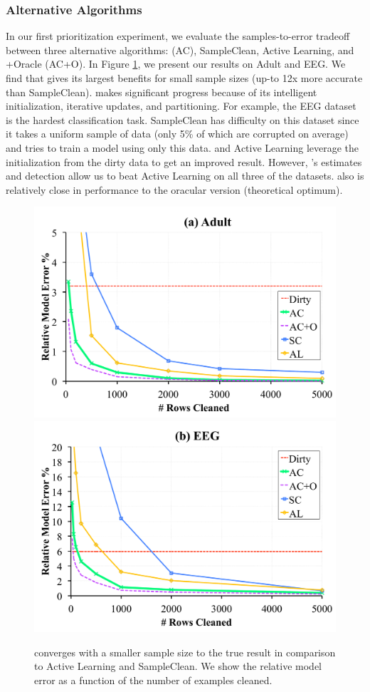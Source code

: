 \subsubsection{Alternative Algorithms}
In our first prioritization experiment, we evaluate the samples-to-error tradeoff between three alternative algorithms: \sys (AC), SampleClean, Active Learning, and \sys+Oracle (AC+O).
In Figure \ref{prio-perf}, we present our results on Adult and EEG. 
We find that \sys gives its largest benefits for small sample sizes (up-to 12x more accurate than SampleClean).
\sys makes significant progress because of its intelligent initialization, iterative updates, and partitioning.
For example, the EEG dataset is the hardest classification task.
SampleClean has difficulty on this dataset since it takes a uniform sample of data (only 5\% of which are corrupted on average) and tries to train a model using only this data.
\sys and Active Learning leverage the initialization from the dirty data to get an improved result. 
However, \sys's estimates and detection allow us to beat Active Learning on all three of the datasets.
\sys also is relatively close in performance to the oracular version (theoretical optimum).

\begin{figure}[ht!]
\centering
 \includegraphics[width=0.49\columnwidth]{exp/exp3b.pdf}
  \includegraphics[width=0.49\columnwidth]{exp/exp3c.pdf}
 \caption{\sys converges with a smaller sample size to the true result in comparison to Active Learning and SampleClean. We show the relative model error as a function of the number of examples cleaned. \label{prio-perf}}
\end{figure}

